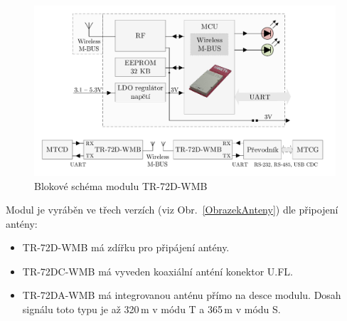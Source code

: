 \newpage

 \begin{figure}[!ht]
	\vspace{-20pt}
  \begin{center}
    \includegraphics[scale=0.6]{obrazky/modul_block}
  \end{center}
	\vspace{-30pt}
  \caption{Blokové schéma modulu TR-72D-WMB \cite{ModulIQRF}}
	\label{BlokovkaIQRF}
	\vspace{-5pt}
\end{figure}

Modul je vyráběn ve třech verzích (viz Obr.~\ref{ObrazekAnteny}) dle připojení antény:
\begin{itemize}
		\item TR-72D-WMB má zdířku pro připájení antény.
		\item TR-72DC-WMB	má vyveden koaxiální anténí konektor U.FL. 
		\item TR-72DA-WMB má integrovanou anténu přímo na desce modulu. Dosah signálu toto typu je až 320\,m v módu T a 365\,m v módu S.
\end{itemize}

